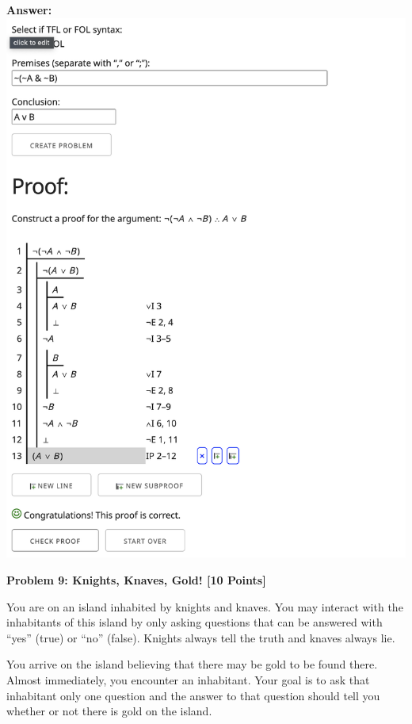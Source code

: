 \documentclass[12pt]{article}
\newcommand{\Problem}[3]{\mbox{} \newline \noindent \textbf{\textbf{Problem #1: #2 [#3 Points] \\ }}}
\begin{document}
\bf{Answer:}
\includegraphics[scale = 0.4]{hw2pr8.png}

\Problem{9}{Knights, Knaves, Gold!}{10}

You are on an island inhabited by knights and knaves. 
You may interact with the inhabitants of this island by only asking questions that can be answered with ``yes'' (true) or ``no'' (false).
Knights always tell the truth and knaves always lie.  

You arrive on the island believing that there may be gold to be found there.  Almost immediately, you encounter an inhabitant.
Your goal is to ask that inhabitant only one question and the answer to that question should tell you whether or not there is gold on the island.
\end{document}
